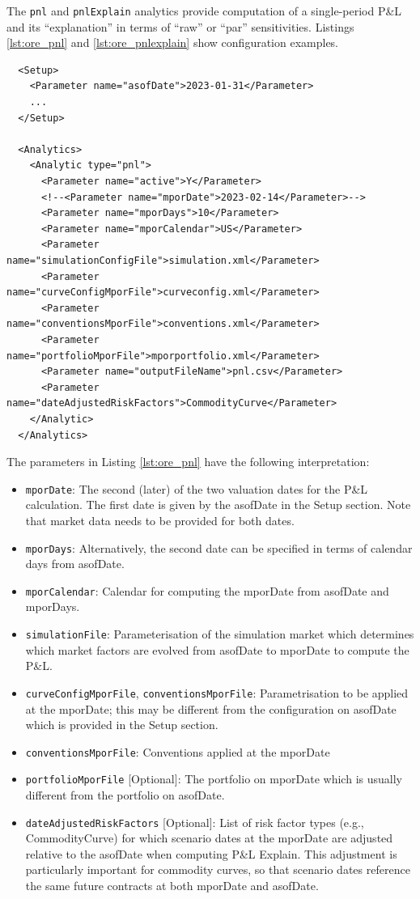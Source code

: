 The {\tt pnl} and {\tt pnlExplain} analytics provide computation of a single-period P\&L and its
``explanation'' in terms of ``raw'' or ``par'' sensitivities. Listings \ref{lst:ore_pnl} and
\ref{lst:ore_pnlexplain} show configuration examples.

\begin{listing}[H]
\begin{verbatim}
  <Setup>
    <Parameter name="asofDate">2023-01-31</Parameter>
    ...
  </Setup>

  <Analytics>
    <Analytic type="pnl">
      <Parameter name="active">Y</Parameter>
      <!--<Parameter name="mporDate">2023-02-14</Parameter>-->
      <Parameter name="mporDays">10</Parameter>
      <Parameter name="mporCalendar">US</Parameter>
      <Parameter name="simulationConfigFile">simulation.xml</Parameter>
      <Parameter name="curveConfigMporFile">curveconfig.xml</Parameter>
      <Parameter name="conventionsMporFile">conventions.xml</Parameter>
      <Parameter name="portfolioMporFile">mporportfolio.xml</Parameter>
      <Parameter name="outputFileName">pnl.csv</Parameter>
      <Parameter name="dateAdjustedRiskFactors">CommodityCurve</Parameter>
    </Analytic>
  </Analytics>
\end{verbatim}
\caption{ORE analytic: P\&L}
\label{lst:ore_pnl}
\end{listing}

The parameters in Listing \ref{lst:ore_pnl} have the following interpretation:

\begin{itemize}
\item {\tt mporDate}: The second (later) of the two valuation dates for the P\&L calculation. The first date is given by the asofDate in the Setup section. Note that market data needs to be provided for both dates.
\item {\tt mporDays}: Alternatively, the second date can be specified in terms of calendar days from asofDate.
\item {\tt mporCalendar}: Calendar for computing the mporDate from asofDate and mporDays.
\item {\tt simulationFile}: Parameterisation of the simulation market which determines which market factors are evolved from asofDate to mporDate to compute the P\&L.
\item {\tt curveConfigMporFile}, {\tt conventionsMporFile}: Parametrisation to be applied at the mporDate; this may be different from the configuration on asofDate which is provided in the Setup section.
\item {\tt conventionsMporFile}: Conventions applied at the mporDate
\item {\tt portfolioMporFile} [Optional]: The portfolio on mporDate which is usually different from the portfolio on asofDate.
\item {\tt dateAdjustedRiskFactors} [Optional]: List of risk factor types (e.g., CommodityCurve) for which scenario dates at the mporDate are adjusted relative to the asofDate when computing P\&L Explain. This adjustment is particularly important for commodity curves, so that scenario dates reference the same future contracts at both mporDate and asofDate.
\end{itemize}

